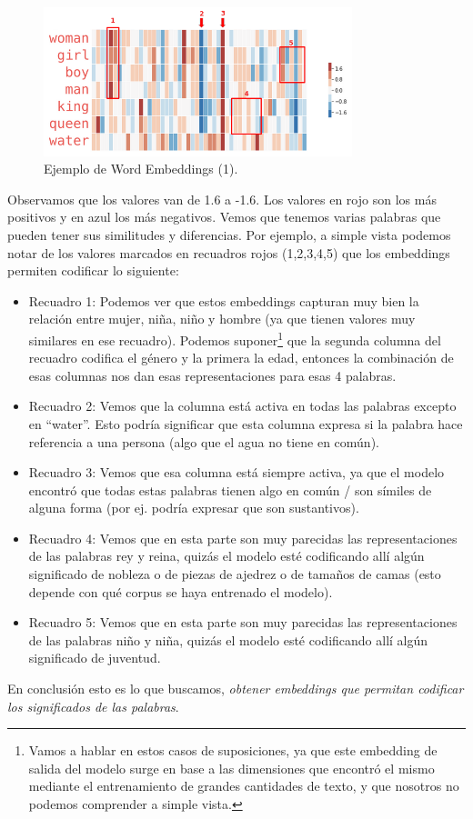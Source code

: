 \documentclass[12pt,a4paper]{article}
\begin{document}
\begin{sloppypar}
\begin{figure}[H]    
 \centering
 \includegraphics[width=0.8\textwidth]{images/NLP/13.png}
 \caption{Ejemplo de Word Embeddings (1)\cite{datitos_nlp}.}
 \label{fig:Imagen_NLP_13}
\end{figure}

Observamos que los valores van de 1.6 a -1.6. Los valores en rojo son los más positivos y en azul los más negativos. Vemos que tenemos varias palabras que pueden tener sus similitudes y diferencias. Por ejemplo, a simple vista podemos notar de los valores marcados en recuadros rojos (1,2,3,4,5) que los embeddings permiten codificar lo siguiente:
\begin{itemize}
\item Recuadro 1: Podemos ver que estos embeddings capturan muy bien la relación entre mujer, niña, niño y hombre (ya que tienen valores muy similares en ese recuadro). Podemos suponer\footnote{Vamos a hablar en estos casos de suposiciones, ya que este embedding de salida del modelo surge en base a las dimensiones que encontró el mismo mediante el entrenamiento de grandes cantidades de texto, y que nosotros no podemos comprender a simple vista.} que la segunda columna del recuadro codifica el género y la primera la edad, entonces la combinación de esas columnas nos dan esas representaciones para esas 4 palabras. 
\item Recuadro 2: Vemos que la columna está activa en todas las palabras excepto en “water”. Esto podría significar que esta columna expresa si la palabra hace referencia a una persona (algo que el agua no tiene en común).
\item Recuadro 3: Vemos que esa columna está siempre activa, ya que el modelo encontró que todas estas palabras tienen algo en común / son símiles de alguna forma (por ej. podría expresar que son sustantivos). 
\item Recuadro 4: Vemos que en esta parte son muy parecidas las representaciones de las palabras rey y reina, quizás el modelo esté codificando allí algún significado de nobleza o de piezas de ajedrez o de tamaños de camas (esto depende con qué corpus se haya entrenado el modelo). 
\item Recuadro 5: Vemos que en esta parte son muy parecidas las representaciones de las palabras niño y niña, quizás el modelo esté codificando allí algún significado de juventud. 
\end{itemize}
En conclusión esto es lo que buscamos, \textit{obtener embeddings que permitan codificar los significados de las palabras}.


\end{sloppypar}
\end{document}
